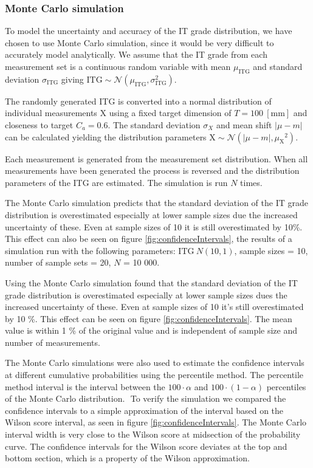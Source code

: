 \documentclass[aip,amsmath, reprint, author-year]{revtex4-1}
\begin{document}
\subsubsection{Monte Carlo simulation}
To model the uncertainty and accuracy of the IT grade distribution, we have chosen to use Monte Carlo simulation, since it would be very difficult to accurately model analytically. We assume that the IT grade from each measurement set is a continuous random variable with mean $\mu_{\mathrm{ITG}}$ and standard deviation $\sigma_{\mathrm{ITG}}$ giving $\mathrm{ITG} \sim \mathcal{N} (\mu_{\mathrm{ITG}}, \sigma_{\mathrm{ITG}}^2)$.

The randomly generated ITG is converted into a normal distribution of individual measurements X using a fixed target dimension of $T = 100 \mathrm{\ [mm]}$ and closeness to target $C_a = 0.6$. 
The standard deviation $\sigma_{X}$ and mean shift $| \mu - m|$ can be calculated yielding the distribution parameters $\mathrm{X} \sim \mathcal{N} (| \mu - m|, {\mu_{\mathrm{X}}}^2)$. 

Each measurement is generated from the measurement set distribution. When all measurements have been generated the process is reversed and the distribution parameters of the ITG are estimated. The simulation is run $N$ times. 

The Monte Carlo simulation predicts that the standard deviation of the IT grade distribution is overestimated especially at lower sample sizes due the increased uncertainty of these. Even at sample sizes of 10 it is still overestimated by 10\%. This effect can also be seen on figure \ref{fig:confidenceIntervals}, the results of a simulation run with the following parameters: $\mathrm{ITG} ~ N (10, 1)$, sample sizes = 10, number of sample sets = 20, $N$ = 10 000.  

Using the Monte Carlo simulation found that the standard deviation of the IT grade distribution is overestimated especially at lower sample sizes dues the increased uncertainty of these. 
Even at sample sizes of 10 it's still overestimated by 10 \%. 
This effect can be seen on figure \ref{fig:confidenceIntervals}. The mean value is within 1 \% of the original value and is independent of sample size and number of measurements.  

The Monte Carlo simulations were also used to estimate the confidence intervals at different cumulative probabilities using the percentile method. The percentile method interval is the interval between the $ 100 \cdot \alpha$ and $100 \cdot (1 − \alpha)$ percentiles of the Monte Carlo distribution.  To verify the simulation we compared the confidence intervals to a simple approximation of the interval based on the Wilson score interval, as seen in figure \ref{fig:confidenceIntervals}. The Monte Carlo interval width is very close to the Wilson score at midsection of the probability curve. The confidence intervals for the Wilson score deviates at the top and bottom section, which is a property of the Wilson approximation.
\end{document}
